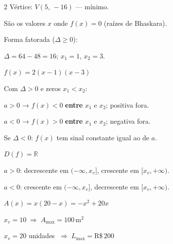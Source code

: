 \documentclass[12pt,twoside]{article}
\begin{document}
\begin{multicols}{2}
Vértice: $V(5,\,-16)$ — mínimo.


São os valores $x$ onde $f(x) = 0$ (raízes de Bhaskara).

Forma fatorada ($\Delta \geq 0$):



$\Delta = 64-48 = 16$; $x_1 = 1$, $x_2 = 3$.

$f(x) = 2(x-1)(x-3)$ \checkmark


Com $\Delta > 0$ e zeros $x_1 < x_2$:

$a > 0$ → $f(x) < 0$ \textbf{entre} $x_1$ e $x_2$; positiva fora.

$a < 0$ → $f(x) > 0$ \textbf{entre} $x_1$ e $x_2$; negativa fora.

Se $\Delta < 0$: $f(x)$ tem sinal constante igual ao de $a$.


$D(f) = \mathbb{R}$


$a > 0$: decrescente em $(-\infty, x_v]$, crescente em $[x_v, +\infty)$.

$a < 0$: crescente em $(-\infty, x_v]$, decrescente em $[x_v, +\infty)$.





$A(x) = x(20-x) = -x^2 + 20x$

$x_v = 10 \;\Rightarrow\; A_{\max} = 100\,\text{m}^2$


$x_v = 20$ unidades $\;\Rightarrow\; L_{\max} = \text{R\$}\,200$

\end{multicols}


\end{document}
